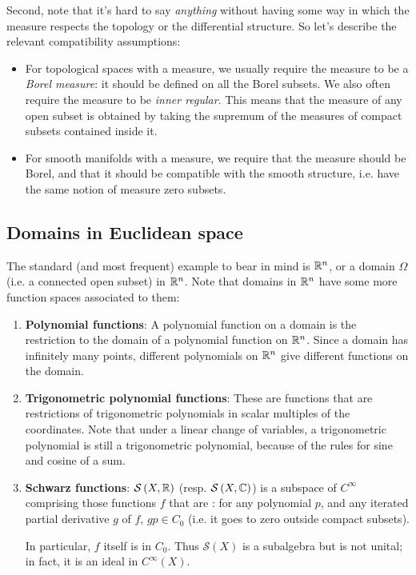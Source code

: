 \documentclass[a4paper]{amsart}
\newcommand{\schwarz}[1]{\mathcal{S}\left(#1\right)}
\begin{document}
Second, note that it's hard to say {\em anything} without having some
way in which the measure respects the topology or the differential
structure. So let's describe the relevant compatibility assumptions:

\begin{itemize}

\item For topological spaces with a measure, we usually require the
  measure to be a {\em Borel measure}: it should be defined on all the
  Borel subsets. We also often require the measure to be {\em inner
    regular}. This means that the measure of any open subset is
  obtained by taking the supremum of the measures of compact subsets
  contained inside it.

\item For smooth manifolds with a measure, we require that the measure
  should be Borel, and that it should be compatible with the smooth
  structure, i.e. have the same notion of measure zero subsets.

\end{itemize}

\subsection{Domains in Euclidean space}

The standard (and most frequent) example to bear in mind is $\mathbb{R}^n$, or
a domain $\Omega$ (i.e. a connected open subset) in $\mathbb{R}^n$. Note that
domains in $\mathbb{R}^n$ have some more function spaces associated to them:

\begin{enumerate}

\item {\bf Polynomial functions}: A polynomial function on a
  domain is the restriction to the domain of a polynomial function on
  $\mathbb{R}^n$. Since a domain has infinitely many points, different
  polynomials on $\mathbb{R}^n$ give different functions on the domain.

\item {\bf Trigonometric polynomial functions}: These are
  functions that are restrictions of trigonometric polynomials in
  scalar multiples of the coordinates. Note that under a linear change
  of variables, a trigonometric polynomial is still a trigonometric
  polynomial, because of the rules for sine and cosine of a sum.

\item {\bf Schwarz functions}: $\schwarz{X,\R}$
  (resp. $\schwarz{X,\C}$) is a subspace of $C^\infty$ comprising
  those functions $f$ that are :
  for any polynomial $p$, and any iterated partial derivative $g$ of
  $f$, $gp \in C_0$ (i.e. it goes to zero outside compact subsets).

  In particular, $f$ itself is in $C_0$. Thus $\schwarz{X}$ is a
  subalgebra but is not unital; in fact, it is an ideal in
  $C^\infty(X)$.

\end{enumerate}
\end{document}

